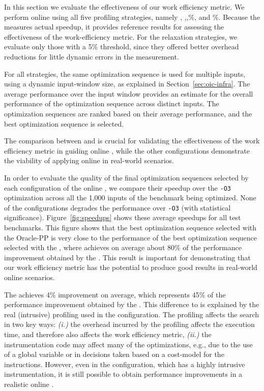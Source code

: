 In this section we evaluate the effectiveness of our work efficiency metric.
We perform online {\itercomp} using all five profiling strategies, namely
\OracleRM, \OraclePP,\OptProf,\%, and \%.
Because the \OracleRM measures actual speedup, it provides reference results for
assessing the effectiveness of the work-efficiency metric.
For the relaxation strategies, we evaluate only those with a 5\% threshold, since
they offered better overhead reductions for little dynamic errors in the measurement.

For all strategies, the same optimization sequence is used for multiple inputs, using a dynamic input-window size, as explained in
Section~\ref{sec:oic-infra}. The average performance over the input window provides an estimate for the overall performance of the
optimization sequence across distinct inputs. The optimization sequences are ranked based on their average performance, and the best
optimization sequence is selected.

The comparison between \OracleRM and \OraclePP is crucial for validating the
effectiveness of the work efficiency metric in guiding online {\itercomp},
while the other configurations demonstrate the viability of applying online
{\itercomp} in real-world scenarios.

In order to evaluate the quality of the final optimization sequences selected by each configuration of the online {\itercomp}, we compare
their speedup over the \texttt{-O3} optimization across all the 1,000 inputs of the benchmark being optimized. None of the configurations
degrades the performance over \texttt{-O3} (with statistical significance).
Figure~\ref{fig:speedups} shows these average speedups for all test benchmarks.
This figure shows that the best optimization sequence selected with the Oracle-PP
is very close to the performance of the best optimization sequence selected with
the \OracleRM, where \OraclePP achieves on average about 80\% of the performance
improvement obtained by the \OracleRM.
This result is important for demonstrating that our work efficiency metric has
the potential to produce good results in real-world online scenarios.

The \OptProf achieves 4\% improvement on average, which represents 45\% of the
performance improvement obtained by the \OracleRM.
This difference to \OraclePP is explained by the real (intrusive) profiling used
in the \OptProf configuration.
The profiling affects the search in two key ways:
\textit{(i.)} the overhead incurred by the profiling affects the execution time,
and therefore also affects the work efficiency metric,
\textit{(ii.)} the instrumentation code may affect many of the optimizations, e.g.,
due to the use of a global variable or in decisions taken based on a cost-model
for the instructions.
However, even in the \OptProf configuration, which has a highly intrusive instrumentation,
it is still possible to obtain performance improvements in a realistic online
{\itercomp}.

